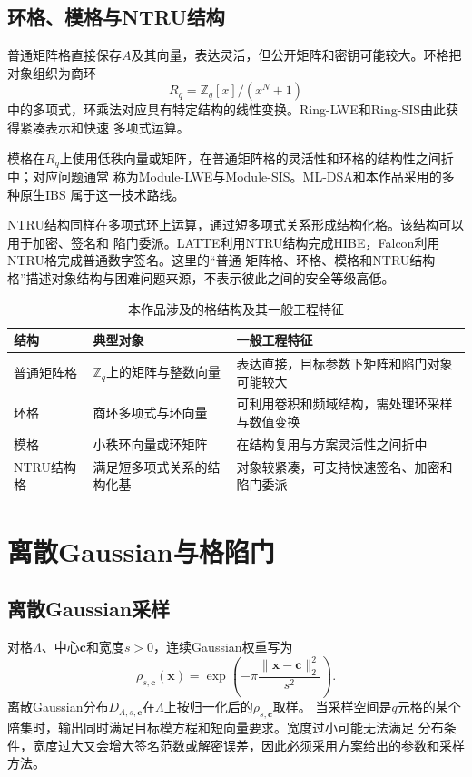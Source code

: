\subsection{环格、模格与NTRU结构}

普通矩阵格直接保存$A$及其向量，表达灵活，但公开矩阵和密钥可能较大。环格把对象组织为商环
\[
 R_q=\mathbb Z_q[x]/(x^N+1)
\]
中的多项式，环乘法对应具有特定结构的线性变换。Ring-LWE和Ring-SIS由此获得紧凑表示和快速
多项式运算\cite{lpr2013ring}。

模格在$R_q$上使用低秩向量或矩阵，在普通矩阵格的灵活性和环格的结构性之间折中；对应问题通常
称为Module-LWE与Module-SIS\cite{langlois2015module}。ML-DSA和本作品采用的多种原生IBS
属于这一技术路线。

NTRU结构同样在多项式环上运算，通过短多项式关系形成结构化格。该结构可以用于加密、签名和
陷门委派。LATTE利用NTRU结构完成HIBE，Falcon利用NTRU格完成普通数字签名。这里的“普通
矩阵格、环格、模格和NTRU结构格”描述对象结构与困难问题来源，不表示彼此之间的安全等级高低。

\begin{table}[H]
\centering\small
\caption{本作品涉及的格结构及其一般工程特征}
\label{tab:lattice-families}
\begin{tabularx}{\textwidth}{@{}p{}p{}X@{}}
\toprule
\rowcolor{black!8} 结构 & 典型对象 & 一般工程特征 \\
\midrule
普通矩阵格 & $\mathbb Z_q$上的矩阵与整数向量 & 表达直接，目标参数下矩阵和陷门对象可能较大 \\
环格 & 商环多项式与环向量 & 可利用卷积和频域结构，需处理环采样与数值变换 \\
模格 & 小秩环向量或环矩阵 & 在结构复用与方案灵活性之间折中 \\
NTRU结构格 & 满足短多项式关系的结构化基 & 对象较紧凑，可支持快速签名、加密和陷门委派 \\
\bottomrule
\end{tabularx}
\end{table}

\section{离散Gaussian与格陷门}

\subsection{离散Gaussian采样}

对格$\Lambda$、中心$\mathbf c$和宽度$s>0$，连续Gaussian权重写为
\[
 \rho_{s,\mathbf c}(\mathbf x)=
 \exp\!\left(-\pi\frac{\lVert\mathbf x-\mathbf c\rVert_2^2}{s^2}\right).
\]
离散Gaussian分布$D_{\Lambda,s,\mathbf c}$在$\Lambda$上按归一化后的$\rho_{s,\mathbf c}$取样。
当采样空间是$q$元格的某个陪集时，输出同时满足目标模方程和短向量要求。宽度过小可能无法满足
分布条件，宽度过大又会增大签名范数或解密误差，因此必须采用方案给出的参数和采样方法。

